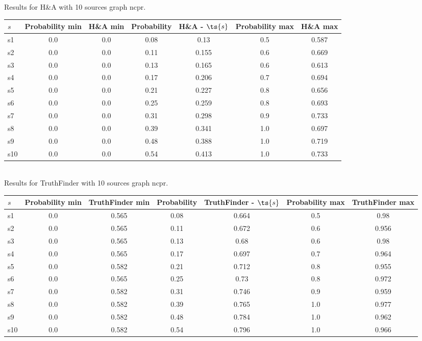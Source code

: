 \documentclass{article}
\begin{document}
\noindent Results for H\&A with 10 sources graph ncpr.

\noindent\begin{tabular}{|l|c|c|c|c|c|c|}
\hline
$s$& Probability min & H\&A min & Probability & H\&A - $\ts{s}$ & Probability max & H\&A max\\
\hline
s1 &0.0 & 0.0 & 0.08 & 0.13 & 0.5 & 0.587\\
\hline
s2 &0.0 & 0.0 & 0.11 & 0.155 & 0.6 & 0.669\\
\hline
s3 &0.0 & 0.0 & 0.13 & 0.165 & 0.6 & 0.613\\
\hline
s4 &0.0 & 0.0 & 0.17 & 0.206 & 0.7 & 0.694\\
\hline
s5 &0.0 & 0.0 & 0.21 & 0.227 & 0.8 & 0.656\\
\hline
s6 &0.0 & 0.0 & 0.25 & 0.259 & 0.8 & 0.693\\
\hline
s7 &0.0 & 0.0 & 0.31 & 0.298 & 0.9 & 0.733\\
\hline
s8 &0.0 & 0.0 & 0.39 & 0.341 & 1.0 & 0.697\\
\hline
s9 &0.0 & 0.0 & 0.48 & 0.388 & 1.0 & 0.719\\
\hline
s10 &0.0 & 0.0 & 0.54 & 0.413 & 1.0 & 0.733\\
\hline
\end{tabular}\\

\noindent Results for TruthFinder with 10 sources graph ncpr.

\noindent\begin{tabular}{|l|c|c|c|c|c|c|}
\hline
$s$& Probability min & TruthFinder min & Probability & TruthFinder - $\ts{s}$ & Probability max & TruthFinder max\\
\hline
s1 &0.0 & 0.565 & 0.08 & 0.664 & 0.5 & 0.98\\
\hline
s2 &0.0 & 0.565 & 0.11 & 0.672 & 0.6 & 0.956\\
\hline
s3 &0.0 & 0.565 & 0.13 & 0.68 & 0.6 & 0.98\\
\hline
s4 &0.0 & 0.565 & 0.17 & 0.697 & 0.7 & 0.964\\
\hline
s5 &0.0 & 0.582 & 0.21 & 0.712 & 0.8 & 0.955\\
\hline
s6 &0.0 & 0.565 & 0.25 & 0.73 & 0.8 & 0.972\\
\hline
s7 &0.0 & 0.582 & 0.31 & 0.746 & 0.9 & 0.959\\
\hline
s8 &0.0 & 0.582 & 0.39 & 0.765 & 1.0 & 0.977\\
\hline
s9 &0.0 & 0.582 & 0.48 & 0.784 & 1.0 & 0.962\\
\hline
s10 &0.0 & 0.582 & 0.54 & 0.796 & 1.0 & 0.966\\
\hline
\end{tabular}\\
\end{document}
